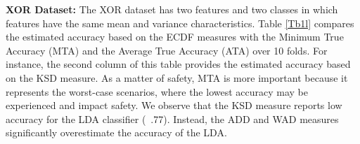 \documentclass{article}
\begin{document}
\textbf{XOR Dataset:}
The XOR dataset has two features and two classes in which features have the same mean and variance characteristics. Table \ref{Tb1l} compares the estimated accuracy based on the ECDF measures with the Minimum True Accuracy (MTA) and the Average True Accuracy (ATA) over 10 folds. For instance, the second column of this table provides the estimated accuracy based on the KSD measure. As a matter of safety, MTA is more important because it represents the worst-case scenarios, where the lowest accuracy may be experienced and impact safety. We observe that the KSD measure reports low accuracy for the LDA classifier (~.77). Instead, the ADD and WAD measures significantly overestimate the accuracy of the LDA.

\begin{comment}
\begin{figure}
\texttt{[image: Pictures/res1.png]}
\caption{Comparison of estimated accuracies vs minimum true accuracy for XOR dataset} \label{fig4}
\end{figure}
\end{comment}

\begin{table}[htbp]
  \centering
  \caption{Comparison of estimated accuracies vs minimum true accuracy for XOR dataset}
  \label{Tb1l}\end{table}
\end{document}
